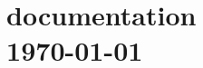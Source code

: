 \documentclass[a4paper]{book}
\begin{document}
\chapter*{\R\ documentation  \\ \ \hfill\large \today}

\printindex
\end{document}
